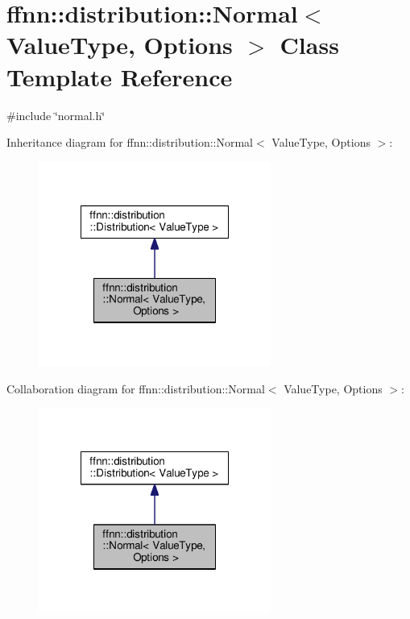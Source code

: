 \hypertarget{classffnn_1_1distribution_1_1_normal}{\section{ffnn\-:\-:distribution\-:\-:Normal$<$ Value\-Type, Options $>$ Class Template Reference}
\label{classffnn_1_1distribution_1_1_normal}
}


{\ttfamily \#include \char`\"{}normal.\-h\char`\"{}}



Inheritance diagram for ffnn\-:\-:distribution\-:\-:Normal$<$ Value\-Type, Options $>$\-:\nopagebreak
\begin{figure}[H]
\begin{center}
\leavevmode
\includegraphics[width=216pt]{classffnn_1_1distribution_1_1_normal__inherit__graph}
\end{center}
\end{figure}


Collaboration diagram for ffnn\-:\-:distribution\-:\-:Normal$<$ Value\-Type, Options $>$\-:\nopagebreak
\begin{figure}[H]
\begin{center}
\leavevmode
\includegraphics[width=216pt]{classffnn_1_1distribution_1_1_normal__coll__graph}
\end{center}
\end{figure}
